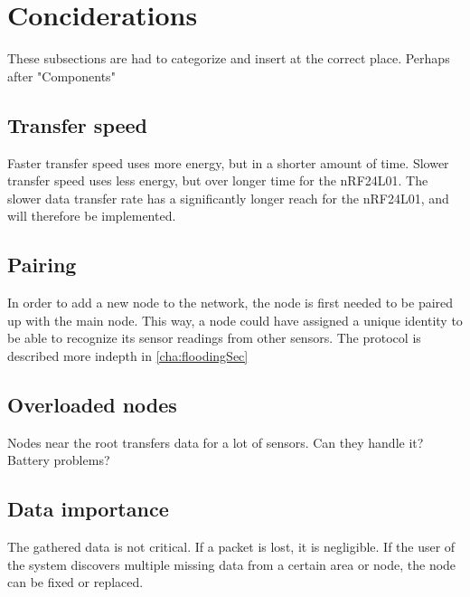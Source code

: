 \section{Conciderations}
These subsections are had to categorize and insert at the correct place. Perhaps after "Components"

\subsection{Transfer speed}
Faster transfer speed uses more energy, but in a shorter amount of time. Slower transfer speed uses less energy, but over longer time for the nRF24L01. The slower data transfer rate has a significantly longer reach for the nRF24L01, and will therefore be implemented. 

\subsection{Pairing}
In order to add a new node to the network, the node is first needed to be paired up with the main node.
This way, a node could have assigned a unique identity to be able to recognize its sensor readings from other sensors. 
The protocol is described more indepth in \ref{cha:floodingSec}

\subsection{Overloaded nodes}
Nodes near the root transfers data for a lot of sensors. Can they handle it? Battery problems? 

\subsection{Data importance}
The gathered data is not critical. If a packet is lost, it is negligible. If the user of the system discovers multiple missing data from a certain area or node, the node can be fixed or replaced.